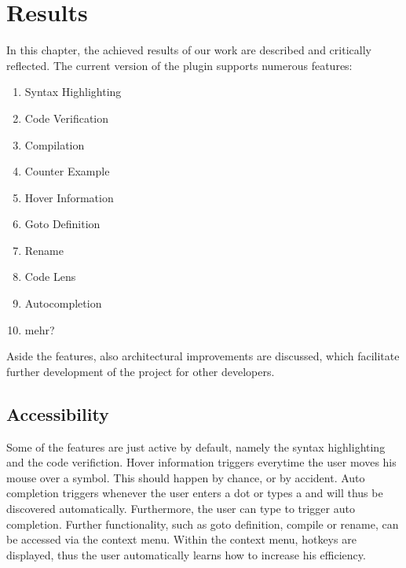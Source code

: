 \section{Results}
\label{section:results}
In this chapter, the achieved results of our work are described and critically reflected.
The current version of the plugin supports numerous features:
\begin{enumerate}
    \item Syntax Highlighting
    \item Code Verification
    \item Compilation
    \item Counter Example
    \item Hover Information
    \item Goto Definition
    \item Rename
    \item Code Lens
    \item Autocompletion
    \item mehr?
\end{enumerate}


Aside the features, also architectural improvements are discussed,
which facilitate further development of the project for other developers.


\subsection{Accessibility}
Some of the features are just active by default, namely the syntax highlighting and the code verifiction.
Hover information triggers everytime the user moves his mouse over a symbol.
This should happen by chance, or by accident.
Auto completion triggers whenever the user enters a dot or types a  and will thus be discovered automatically.
Furthermore, the user can type  to trigger auto completion.
Further functionality, such as goto definition, compile or rename, can be accessed via the context menu.
Within the context menu, hotkeys are displayed, thus the user automatically learns how to increase his efficiency.

